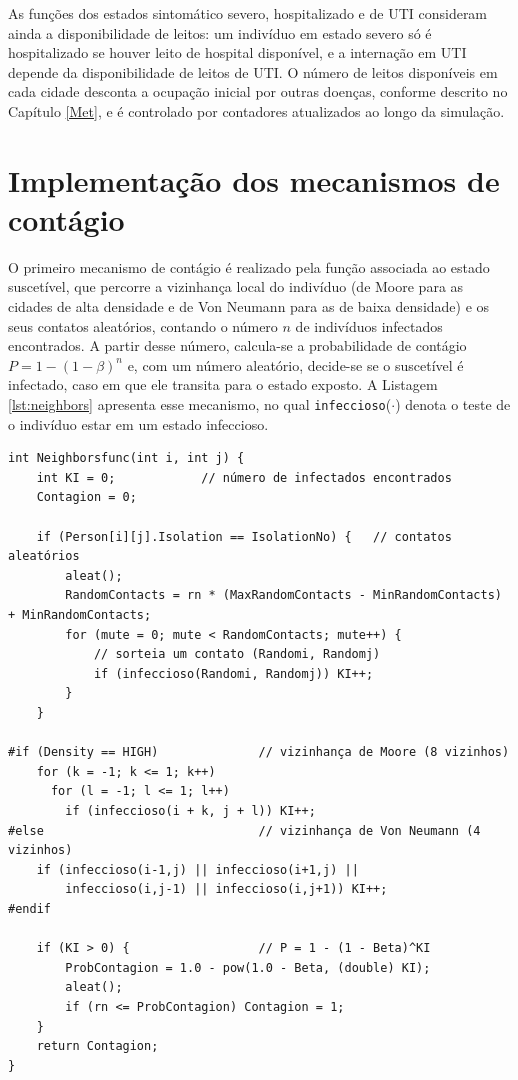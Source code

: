 As funções dos estados sintomático severo, hospitalizado e de UTI consideram ainda a disponibilidade de leitos: um indivíduo em estado severo só é hospitalizado se houver leito de hospital disponível, e a internação em UTI depende da disponibilidade de leitos de UTI. O número de leitos disponíveis em cada cidade desconta a ocupação inicial por outras doenças, conforme descrito no Capítulo \ref{Met}, e é controlado por contadores atualizados ao longo da simulação.

\section{Implementação dos mecanismos de contágio}

O primeiro mecanismo de contágio é realizado pela função associada ao estado suscetível, que percorre a vizinhança local do indivíduo (de Moore para as cidades de alta densidade e de Von Neumann para as de baixa densidade) e os seus contatos aleatórios, contando o número $n$ de indivíduos infectados encontrados. A partir desse número, calcula-se a probabilidade de contágio $P = 1 - (1 - \beta)^n$ e, com um número aleatório, decide-se se o suscetível é infectado, caso em que ele transita para o estado exposto. A Listagem \ref{lst:neighbors} apresenta esse mecanismo, no qual \texttt{infeccioso}($\cdot$) denota o teste de o indivíduo estar em um estado infeccioso.

\begin{lstlisting}[caption={Primeiro mecanismo: o suscetível busca infectados (\texttt{Neighborsfunc}).}, label={lst:neighbors}]
int Neighborsfunc(int i, int j) {
    int KI = 0;            // número de infectados encontrados
    Contagion = 0;

    if (Person[i][j].Isolation == IsolationNo) {   // contatos aleatórios
        aleat();
        RandomContacts = rn * (MaxRandomContacts - MinRandomContacts) + MinRandomContacts;
        for (mute = 0; mute < RandomContacts; mute++) {
            // sorteia um contato (Randomi, Randomj)
            if (infeccioso(Randomi, Randomj)) KI++;
        }
    }

#if (Density == HIGH)              // vizinhança de Moore (8 vizinhos)
    for (k = -1; k <= 1; k++)
      for (l = -1; l <= 1; l++)
        if (infeccioso(i + k, j + l)) KI++;
#else                              // vizinhança de Von Neumann (4 vizinhos)
    if (infeccioso(i-1,j) || infeccioso(i+1,j) ||
        infeccioso(i,j-1) || infeccioso(i,j+1)) KI++;
#endif

    if (KI > 0) {                  // P = 1 - (1 - Beta)^KI
        ProbContagion = 1.0 - pow(1.0 - Beta, (double) KI);
        aleat();
        if (rn <= ProbContagion) Contagion = 1;
    }
    return Contagion;
}
\end{lstlisting}

